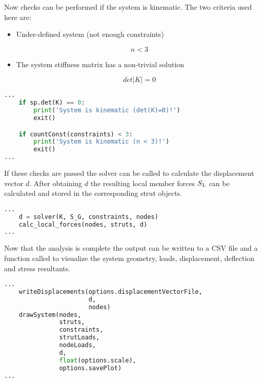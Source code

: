 Now checks can be performed if the system is kinematic. The two criteria used here are:
\begin{itemize}

  \item Under-defined system (not enough constraints)

\begin{equation}
n < 3
\end{equation}

  \item The system stiffness matrix has a non-trivial solution

\begin{equation}
det \lvert K \lvert = 0
\end{equation}

\end{itemize}

\begin{inconsolata}
\begin{minipage}{\linewidth}
\begin{lstlisting}[language=python]
...
    if sp.det(K) == 0:
        print('System is kinematic (det(K)=0)!')
        exit()

    if countConst(constraints) < 3:
        print('System is kinematic (n < 3)!')
        exit()
...
\end{lstlisting}
\end{minipage}
\end{inconsolata}

If these checks are passed the solver can be called to calculate the displacement vector $d$.
After obtaining $d$ the resulting local member forces $S\textsubscript{L}$ can be calculated and stored in the corresponding strut objects.

\begin{inconsolata}
\begin{minipage}{\linewidth}
\begin{lstlisting}[language=python]
...
    d = solver(K, S_G, constraints, nodes)
    calc_local_forces(nodes, struts, d)
...
\end{lstlisting}
\end{minipage}
\end{inconsolata}

Now that the analysis is complete the output can be written to a CSV file and a function called to visualize the system geometry, loads, displacement, deflection and stress resultants.

\begin{inconsolata}
\begin{minipage}{\linewidth}
\begin{lstlisting}[language=python]
...
    writeDisplacements(options.displacementVectorFile,
                       d,
                       nodes)
    drawSystem(nodes,
               struts,
               constraints,
               strutLoads,
               nodeLoads,
               d,
               float(options.scale),
               options.savePlot)
...
\end{lstlisting}
\end{minipage}
\end{inconsolata}


